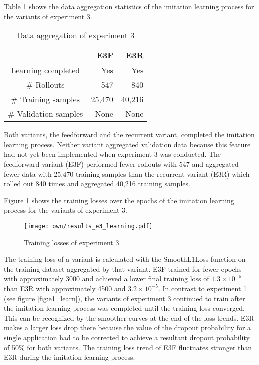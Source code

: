 Table \ref{tab:e3_data} shows
the data aggregation statistics of the imitation learning process for the variants of experiment 3.
\begin{table}[h]
    \caption[
        Data aggregation of experiment 3
    ]{
        Data aggregation of experiment 3
        \label{tab:e3_data}}        
    \centering
    \begin{tabular}{|c|r|r|} 
        \cline{2-3}
        \multicolumn{1}{c|}{}
        &E3F
        &E3R
        \\\hline
        Learning completed
        &Yes
        &Yes
        \\\hline
        \# Rollouts
        &547
        &840
        \\\hline
        \# Training samples
        &25,470
        &40,216
        \\\hline
        \# Validation samples
        &None
        &None
        \\\hline
    \end{tabular}
\end{table}
Both variants, the feedforward and the recurrent variant, completed the imitation learning process.
Neither variant aggregated validation data 
because this feature had not yet been implemented when experiment 3 was conducted.
The feedforward variant (E3F) performed fewer rollouts with 547
and aggregated fewer data with 25,470 training samples
than the recurrent variant (E3R) which rolled out 840 times
and aggregated 40,216 training samples.

Figure \ref{fig:e3_learn} shows the 
training losses over the epochs of the imitation learning process for the variants of experiment 3.
\begin{figure}
    \centering
    \texttt{[image: own/results\_e3\_learning.pdf]}
    \caption[
        Training losses of experiment 3
    ]{
        Training losses of experiment 3
    \label{fig:e3_learn}}
\end{figure}
The training loss of a variant is calculated with the SmoothL1Loss function
on the training dataset aggregated by that variant.
E3F trained for fewer epochs with approximately 3000
and achieved a lower final training loss of $1.3\times 10^{-5}$
than E3R with approximately 4500 and $3.2\times 10^{-5}$.
In contrast to experiment 1 (see figure \ref{fig:e1_learn}),
the variants of experiment 3
continued to train
after the imitation learning process was completed 
until the training loss converged.
This can be recognized by the smoother curves at the end of the loss trends.
E3R makes a larger loss drop there
because the value of the dropout probability for a single application
had to be corrected to achieve a resultant dropout probability of 50\% for both variants.
The training loss trend of E3F fluctuates stronger than E3R
during the imitation learning process.


